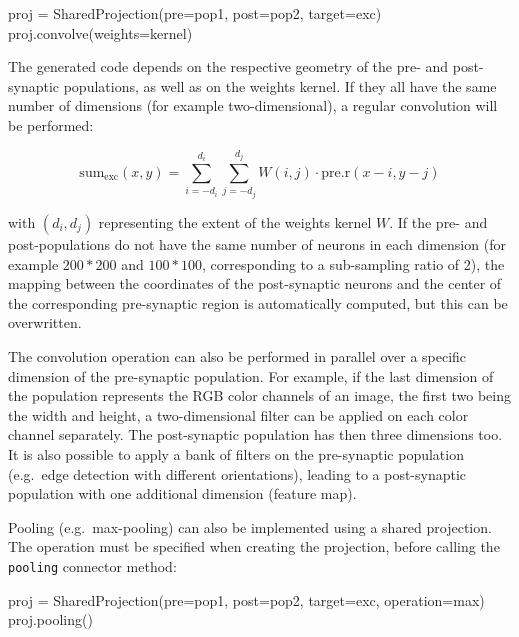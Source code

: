 \documentclass[
  11pt,
  a4paper,
]{scrbook}
\newenvironment{Shaded}{}{}
\newcommand{\NormalTok}[1]{\textcolor[rgb]{0.14,0.16,0.18}{#1}}
\newcommand{\OperatorTok}[1]{\textcolor[rgb]{0.14,0.16,0.18}{#1}}
\newcommand{\StringTok}[1]{\textcolor[rgb]{0.01,0.18,0.38}{#1}}
\begin{document}
\begin{Shaded}
\begin{Highlighting}[]
\NormalTok{proj }\OperatorTok{=}\NormalTok{ SharedProjection(pre}\OperatorTok{=}\NormalTok{pop1, post}\OperatorTok{=}\NormalTok{pop2, target}\OperatorTok{=}\StringTok{\textquotesingle{}exc\textquotesingle{}}\NormalTok{)}
\NormalTok{proj.convolve(weights}\OperatorTok{=}\NormalTok{kernel)}
\end{Highlighting}
\end{Shaded}

The generated code depends on the respective geometry of the pre- and
post-synaptic populations, as well as on the weights kernel. If they all
have the same number of dimensions (for example two-dimensional), a
regular convolution will be performed:

\[
\text{sum}_\text{exc}(x, y) = \sum_{i=-d_i}^{d_i} \sum_{j=-d_j}^{d_j} W(i, j) \cdot \text{pre.r}(x - i, y - j)
\]

with \((d_i, d_j)\) representing the extent of the weights kernel \(W\).
If the pre- and post-populations do not have the same number of neurons
in each dimension (for example \(200*200\) and \(100*100\),
corresponding to a sub-sampling ratio of 2), the mapping between the
coordinates of the post-synaptic neurons and the center of the
corresponding pre-synaptic region is automatically computed, but this
can be overwritten.

The convolution operation can also be performed in parallel over a
specific dimension of the pre-synaptic population. For example, if the
last dimension of the population represents the RGB color channels of an
image, the first two being the width and height, a two-dimensional
filter can be applied on each color channel separately. The
post-synaptic population has then three dimensions too. It is also
possible to apply a bank of filters on the pre-synaptic population
(e.g.~edge detection with different orientations), leading to a
post-synaptic population with one additional dimension (feature map).

Pooling (e.g.~max-pooling) can also be implemented using a shared
projection. The operation must be specified when creating the
projection, before calling the \texttt{pooling} connector method:

\begin{Shaded}
\begin{Highlighting}[]
\NormalTok{proj }\OperatorTok{=}\NormalTok{ SharedProjection(pre}\OperatorTok{=}\NormalTok{pop1, post}\OperatorTok{=}\NormalTok{pop2, target}\OperatorTok{=}\StringTok{\textquotesingle{}exc\textquotesingle{}}\NormalTok{, operation}\OperatorTok{=}\StringTok{\textquotesingle{}max\textquotesingle{}}\NormalTok{)}
\NormalTok{proj.pooling()}
\end{Highlighting}
\end{Shaded}
\end{document}
